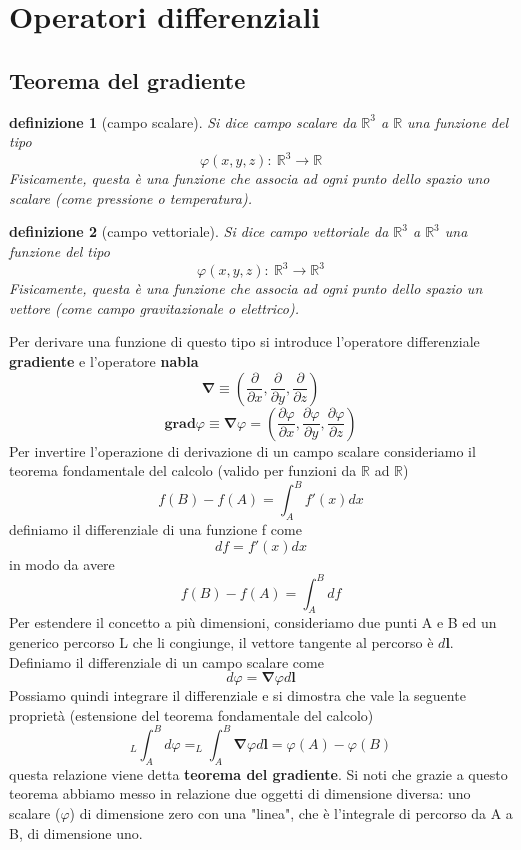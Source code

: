\documentclass[10pt,a4paper]{article}
\newtheorem{definizione}{definizione}
\begin{document}
\section{Operatori differenziali}
\subsection{Teorema del gradiente}
\begin{definizione}[campo scalare]
	Si dice campo scalare da \(\mathbb{R}^3\) a \(\mathbb{R}\) una funzione del tipo 
	\[\varphi(x, y, z):\ \mathbb{R}^3\rightarrow \mathbb{R}\]
	Fisicamente, questa è una funzione che associa ad ogni punto dello spazio uno scalare (come pressione o temperatura).
\end{definizione}
\begin{definizione}[campo vettoriale]
	Si dice campo vettoriale da \(\mathbb{R}^3\) a \(\mathbb{R}^3\) una funzione del tipo 
	\[\varphi(x, y, z):\ \mathbb{R}^3\rightarrow \mathbb{R}^3\]
	Fisicamente, questa è una funzione che associa ad ogni punto dello spazio un vettore (come campo gravitazionale o elettrico).
\end{definizione}
Per derivare una funzione di questo tipo si introduce l'operatore differenziale \textbf{gradiente} e l'operatore \textbf{nabla}
\[\mathbf{\nabla} \equiv \left(\frac{\partial}{\partial x}, \frac{\partial }{\partial y}, \frac{\partial }{\partial z}\right)\]
\[\mathbf{grad}\varphi \equiv \mathbf{\nabla}\varphi = \left(\frac{\partial\varphi }{\partial x}, \frac{\partial\varphi }{\partial y}, \frac{\partial\varphi }{\partial z}\right)\]
Per invertire l'operazione di derivazione di un campo scalare consideriamo il teorema fondamentale del calcolo (valido per funzioni da \(\mathbb{R}\) ad \(\mathbb{R}\))
\[f(B)-f(A) = \int_{A}^{B}f'(x)dx\]
definiamo il differenziale di una funzione f come
\[df = f'(x)dx\] 
in modo da avere
\[f(B)-f(A) = \int_{A}^{B}df\]
Per estendere il concetto a più dimensioni, consideriamo due punti A e B ed un generico percorso L che li congiunge, il vettore tangente al percorso è $d\mathbf{l}$.  Definiamo il differenziale di un campo scalare come 
\[d\varphi = \mathbf{\nabla}\varphi d\mathbf{l}\]
Possiamo quindi integrare il differenziale e si dimostra che vale la seguente proprietà (estensione del teorema fondamentale del calcolo)
\[_L\int_{A}^{B}d\varphi = _L\int_{A}^{B}\mathbf{\nabla}\varphi d\mathbf{l} = \varphi(A)-\varphi(B)\]
questa relazione viene detta \textbf{teorema del gradiente}. Si noti che grazie a questo teorema abbiamo messo in relazione due oggetti di dimensione diversa: uno scalare (\(\varphi\)) di dimensione zero con una "linea", che è l'integrale di percorso da A a B, di dimensione uno.
\end{document}
